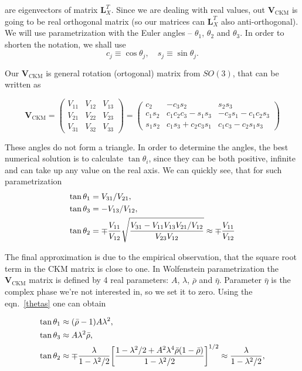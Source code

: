 \documentclass[12pt, a4paper]{article}
\renewcommand{\ni}{
	\noindent
}
\newcommand{\Le}{
	\ensuremath{\mathbf{L}}
}
\newcommand{\V}{
	\ensuremath{\mathbf{V}}
}
\begin{document}
\ni are eigenvectors of matrix $\Le_X^T$. Since we are dealing with real values, out $\V_\text{CKM}$ is
going to be real orthogonal matrix (so our matrices can $\Le_X^T$ also anti-orthogonal). We will
use parametrization with the Euler angles -- $\theta_1$, $\theta_2$ and $\theta_3$. In order to shorten the notation, we
shall use
\[
	c_j \equiv \cos\theta_j, \quad s_j \equiv \sin\theta_j.
\]

Our $\V_\text{CKM}$ is general rotation (ortogonal) matrix from $SO(3)$, that can be written as

\begin{equation}
	\V_\text{CKM} = \begin{pmatrix}
		V_{11} & V_{12} & V_{13} \\
		V_{21} & V_{22} & V_{23} \\
		V_{31} & V_{32} & V_{33}
	\end{pmatrix} = 
	\begin{pmatrix}
		c_2 & -c_3 s_2 & s_2 s_3 \\
		c_1 s_2 & c_1 c_2 c_3 - s_1 s_3 & -c_3 s_1 - c_1 c_2 s_3 \\
		s_1 s_2 & c_1 s_3 + c_2 c_3 s_1 & c_1 c_3 - c_2 s_1 s_3
	\end{pmatrix}
\end{equation}

\ni These angles do not form a triangle. In order to determine the angles, the best numerical solution is to calculate
$\tan\theta_i$, since they can be both positive, infinite and can take up any value on the real axis. We can quickly see, that
for such parametrization
\begin{align}
	\tan\theta_1 &= V_{31}/V_{21}, \notag \\
	\tan\theta_3 &= -V_{13}/V_{12}, \notag \\
	\tan\theta_2 &= \mp \frac{V_{11}}{V_{12}}\sqrt{\frac{V_{31} - V_{11}V_{13}V_{21}/V_{12}}{V_{23}V_{12}}} \approx
		\mp\frac{V_{11}}{V_{12}}
	\label{thetas}
\end{align}
\ni The final approximation is due to the empirical observation, that the square root term in the CKM matrix is close to
one. In Wolfenstein parametrization the $\V_\text{CKM}$ matrix is defined by 4 real parameters: $A$, $\lambda$, $\bar{\rho}$
and $\bar{\eta}$. Parameter $\bar{\eta}$ is the complex phase we're not interested in, so we set it to zero. Using the
eqn.~\eqref{thetas} one can obtain

\begin{align}
	\tan\theta_1 &\approx (\bar{\rho} - 1)A\lambda^2, \notag \\
	\tan\theta_3 &\approx A\lambda^2\bar{\rho}, \notag \\
	\tan\theta_2 &\approx \mp\frac{\lambda}{1 - \lambda^2/2}
		\bigg[\frac{1 - \lambda^2/2 + A^2\lambda^4\bar{\rho}(1 - \bar{\rho})}{1 - \lambda^2/2}\bigg]^{1/2} \approx
		\frac{\lambda}{1 - \lambda^2/2},
\end{align}
\end{document}
